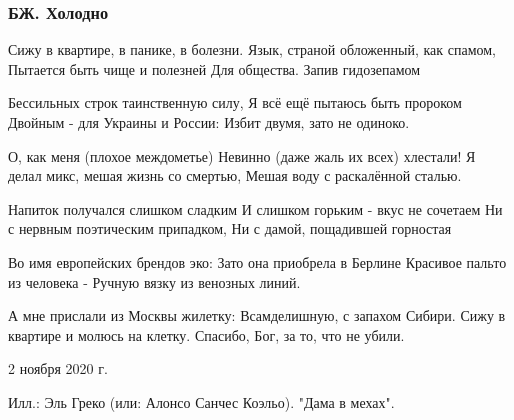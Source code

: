  
 
 

\subsubsection{БЖ. Холодно}
\label{sec:poetry.rus.evgenija_bilchenko.holodno}

Сижу в квартире, в панике, в болезни.
Язык, страной обложенный, как спамом,
Пытается быть чище и полезней
Для общества. Запив гидозепамом

Бессильных строк таинственную силу,
Я всё ещё пытаюсь быть пророком
Двойным - для Украины и России:
Избит двумя, зато не одиноко.

О, как меня (плохое междометье)
Невинно (даже жаль их всех) хлестали!
Я делал микс, мешая жизнь со смертью,
Мешая воду с раскалённой сталью.

Напиток получался слишком сладким
И слишком горьким - вкус не сочетаем
Ни с нервным поэтическим припадком,
Ни с дамой, пощадившей горностая

Во имя европейских брендов эко:
Зато она приобрела в Берлине
Красивое пальто из человека -
Ручную вязку из венозных линий.

А мне прислали из Москвы жилетку:
Всамделишную, с запахом Сибири.
Сижу в квартире и молюсь на клетку.
Спасибо, Бог, за то, что не убили.

2 ноября 2020 г. 

Илл.: Эль Греко (или: Алонсо Санчес Коэльо). "Дама в мехах".
